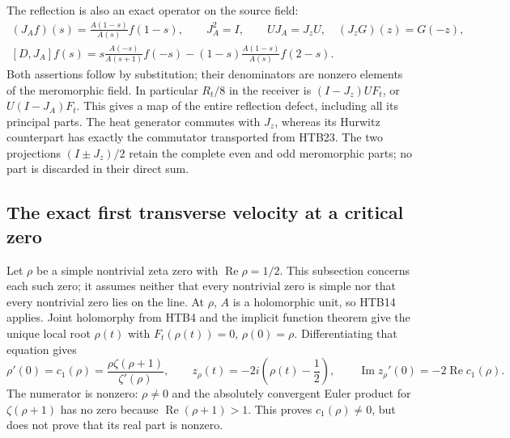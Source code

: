 \documentclass[11pt]{article}
\theoremstyle{definition}
\begin{document}
The reflection is also an exact operator on the source field:
\begin{equation}\tag{HTB23}
\begin{gathered}
 (J_A f)(s)=\frac{A(1-s)}{A(s)}f(1-s),\qquad J_A^2=I,
 \qquad UJ_A=J_zU,\quad (J_zG)(z)=G(-z),\\
 [D,J_A]f(s)
 =s\frac{A(-s)}{A(s+1)}f(-s)
 -(1-s)\frac{A(1-s)}{A(s)}f(2-s).
\end{gathered}
\end{equation}
Both assertions follow by substitution; their denominators are nonzero
elements of the meromorphic field. In particular
$R_t/8$ in the receiver is $(I-J_z)UF_t$, or $U(I-J_A)F_t$.
This gives a map of the entire reflection defect, including all its
principal parts. The heat generator commutes with $J_z$, whereas its
Hurwitz counterpart has exactly the commutator transported from
HTB23. The two projections $(I\pm J_z)/2$ retain the complete even
and odd meromorphic parts; no part is discarded in their direct sum.

\subsection{The exact first transverse velocity at a critical zero}

Let $\rho$ be a simple nontrivial zeta zero with
$\operatorname{Re}\rho=1/2$. This subsection concerns each such zero;
it assumes neither that every nontrivial zero is simple nor that every
nontrivial zero lies on the line. At $\rho$, $A$ is a holomorphic unit,
so HTB14 applies. Joint holomorphy from HTB4 and the implicit function
theorem give the unique local root $\rho(t)$ with
$F_t(\rho(t))=0$, $\rho(0)=\rho$. Differentiating that equation gives
\begin{equation}\tag{HTB24}
 \rho'(0)=c_1(\rho)
 =\frac{\rho\zeta(\rho+1)}{\zeta'(\rho)},\qquad
 z_\rho(t)=-2i\left(\rho(t)-\frac12\right),\qquad
 \operatorname{Im}z_\rho'(0)=-2\operatorname{Re}c_1(\rho).
\end{equation}
The numerator is nonzero: $\rho\ne0$ and the absolutely convergent
Euler product for $\zeta(\rho+1)$ has no zero because
$\operatorname{Re}(\rho+1)>1$. This proves $c_1(\rho)\ne0$, but does
not prove that its real part is nonzero.
\end{document}
